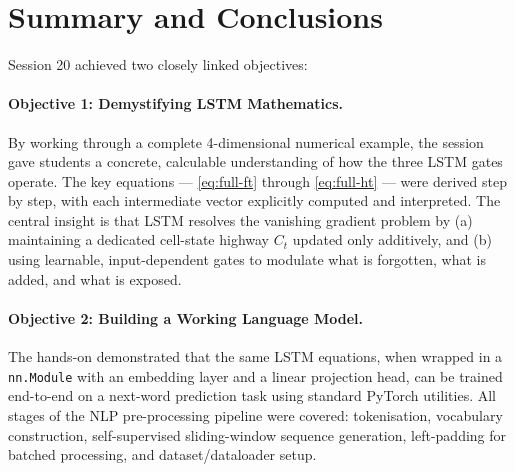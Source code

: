 \documentclass[12pt,a4paper]{article}
\begin{document}
\section{Summary and Conclusions}
\label{sec:summary}

Session 20 achieved two closely linked objectives:

\paragraph{Objective 1: Demystifying LSTM Mathematics.}
By working through a complete 4-dimensional numerical example, the session
gave students a concrete, calculable understanding of how the three LSTM
gates operate.  The key equations --- \cref{eq:full-ft} through
\cref{eq:full-ht} --- were derived step by step, with each intermediate vector
explicitly computed and interpreted.  The central insight is that LSTM resolves
the vanishing gradient problem by (a) maintaining a dedicated cell-state
highway $C_t$ updated only additively, and (b) using learnable, input-dependent
gates to modulate what is forgotten, what is added, and what is exposed.

\paragraph{Objective 2: Building a Working Language Model.}
The hands-on demonstrated that the same LSTM equations, when wrapped in a
\texttt{nn.Module} with an embedding layer and a linear projection head, can
be trained end-to-end on a next-word prediction task using standard PyTorch
utilities.  All stages of the NLP pre-processing pipeline were covered:
tokenisation, vocabulary construction, self-supervised sliding-window sequence
generation, left-padding for batched processing, and dataset/dataloader setup.
\end{document}
